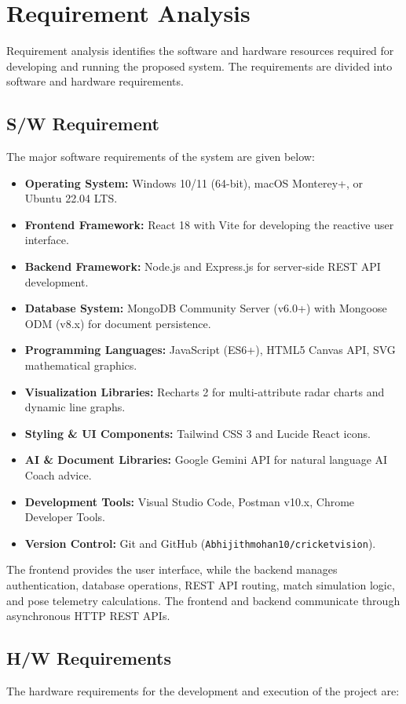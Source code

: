 \section{Requirement Analysis}
Requirement analysis identifies the software and hardware resources required for developing and running the proposed system. The requirements are divided into software and hardware requirements.

\subsection{S/W Requirement}
The major software requirements of the system are given below:

\begin{itemize}
    \item \textbf{Operating System:} Windows 10/11 (64-bit), macOS Monterey+, or Ubuntu 22.04 LTS.
    \item \textbf{Frontend Framework:} React 18 with Vite for developing the reactive user interface.
    \item \textbf{Backend Framework:} Node.js and Express.js for server-side REST API development.
    \item \textbf{Database System:} MongoDB Community Server (v6.0+) with Mongoose ODM (v8.x) for document persistence.
    \item \textbf{Programming Languages:} JavaScript (ES6+), HTML5 Canvas API, SVG mathematical graphics.
    \item \textbf{Visualization Libraries:} Recharts 2 for multi-attribute radar charts and dynamic line graphs.
    \item \textbf{Styling \& UI Components:} Tailwind CSS 3 and Lucide React icons.
    \item \textbf{AI \& Document Libraries:} Google Gemini API for natural language AI Coach advice.
    \item \textbf{Development Tools:} Visual Studio Code, Postman v10.x, Chrome Developer Tools.
    \item \textbf{Version Control:} Git and GitHub (\texttt{Abhijithmohan10/cricketvision}).
\end{itemize}

The frontend provides the user interface, while the backend manages authentication, database operations, REST API routing, match simulation logic, and pose telemetry calculations. The frontend and backend communicate through asynchronous HTTP REST APIs.

\subsection{H/W Requirements}
The hardware requirements for the development and execution of the project are:

